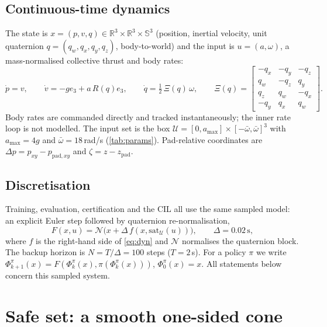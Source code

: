 \documentclass[11pt,a4paper]{article}
\newcommand{\R}{\mathbb{R}}
\newcommand{\U}{\mathcal{U}}
\begin{document}
\subsection{Continuous-time dynamics}
The state is $x=(p,v,q)\in\R^3\times\R^3\times\mathbb{S}^3$ (position, inertial velocity, unit quaternion
$q=(q_w,q_x,q_y,q_z)$, body-to-world) and the input is $u=(a,\omega)$, a mass-normalised collective thrust and
body rates:
\begin{equation}
\dot p = v,\qquad \dot v = -g e_3 + a\,R(q)e_3,\qquad \dot q = \tfrac12\,\Xi(q)\,\omega,\qquad
\Xi(q)=\begin{bmatrix}-q_x&-q_y&-q_z\\ q_w&-q_z&q_y\\ q_z&q_w&-q_x\\ -q_y&q_x&q_w\end{bmatrix}.
\label{eq:dyn}
\end{equation}
Body rates are commanded directly and tracked instantaneously; the inner rate loop is not modelled.
The input set is the box $\U=[0,a_{\max}]\times[-\bar\omega,\bar\omega]^3$ with $a_{\max}=4g$ and
$\bar\omega=18$\,rad/s (\cref{tab:params}). Pad-relative coordinates are
$\Delta p=p_{xy}-p_{\mathrm{pad},xy}$ and $\zeta=z-z_{\mathrm{pad}}$.

\subsection{Discretisation}
Training, evaluation, certification and the CIL all use the same sampled model: an explicit Euler step
followed by quaternion re-normalisation,
\begin{equation}
F(x,u)=\mathcal{N}\big(x+\Delta\,f(x,\mathrm{sat}_{\U}(u))\big),\qquad \Delta=0.02\,\mathrm{s},
\label{eq:euler}
\end{equation}
where $f$ is the right-hand side of \eqref{eq:dyn} and $\mathcal{N}$ normalises the quaternion block. The
backup horizon is $N=T/\Delta=100$ steps ($T=2$\,s). For a policy $\pi$ we write
$\Phi^{\pi}_{k+1}(x)=F(\Phi^{\pi}_k(x),\pi(\Phi^{\pi}_k(x)))$, $\Phi^\pi_0(x)=x$. All statements below concern
this sampled system.

\begin{table}[t]
\centering\small
\caption{Model and task parameters.}
\label{tab:params}

\end{table}

\section{Safe set: a smooth one-sided cone}
\end{document}
